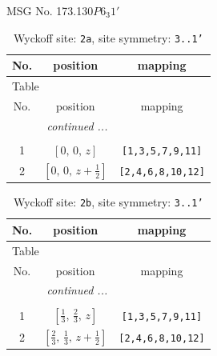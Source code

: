 \documentclass[fleqn,8pt]{jsarticle}
\begin{document}
\setcounter{MaxMatrixCols}{32}

\renewcommand{\tablename}{Table~}
\renewcommand{\figurename}{Figure~}
\begin{center}
\LARGE
MSG No. 173.130\quad$P6_{3}1'$
\end{center}
\renewcommand{\arraystretch}{1.2}
\begin{longtable}{ccc}
\caption{Wyckoff site: {\tt 2a}, site symmetry: {\tt 3..1'}}
 \\
 \hline \hline
No. & position & mapping \\ \hline \endfirsthead

\multicolumn{2}{l}{\tablename\ \thetable{}} \\
 \hline \hline
No. & position & mapping \\ \hline \endhead

 \hline \hline
\multicolumn{2}{r}{\footnotesize\it continued ...} \\ \endfoot

 \hline \hline
\multicolumn{2}{r}{} \\ \endlastfoot

1 & $\left[ 0,\, 0,\, z \right]$ & {\tt [1,3,5,7,9,11]} \\ \hline
2 & $\left[ 0,\, 0,\, z + \frac{1}{2} \right]$ & {\tt [2,4,6,8,10,12]} \\
\end{longtable}
\renewcommand{\arraystretch}{1.2}
\begin{longtable}{ccc}
\caption{Wyckoff site: {\tt 2b}, site symmetry: {\tt 3..1'}}
 \\
 \hline \hline
No. & position & mapping \\ \hline \endfirsthead

\multicolumn{2}{l}{\tablename\ \thetable{}} \\
 \hline \hline
No. & position & mapping \\ \hline \endhead

 \hline \hline
\multicolumn{2}{r}{\footnotesize\it continued ...} \\ \endfoot

 \hline \hline
\multicolumn{2}{r}{} \\ \endlastfoot

1 & $\left[ \frac{1}{3},\, \frac{2}{3},\, z \right]$ & {\tt [1,3,5,7,9,11]} \\ \hline
2 & $\left[ \frac{2}{3},\, \frac{1}{3},\, z + \frac{1}{2} \right]$ & {\tt [2,4,6,8,10,12]} \\
\end{longtable}
\end{document}

